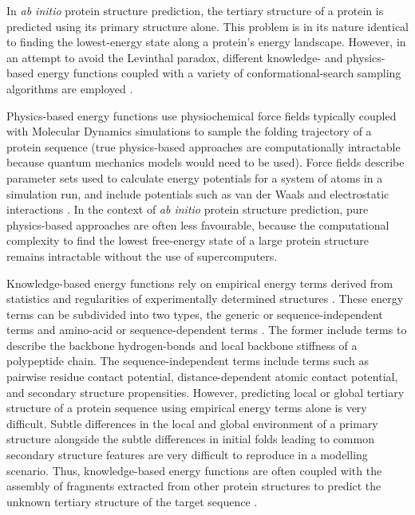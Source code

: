 In \textit{ab initio} protein structure prediction, the tertiary structure of a protein is predicted using its primary structure alone. This problem is in its nature identical to finding the lowest-energy state along a protein's energy landscape. However, in an attempt to avoid the Levinthal paradox, different knowledge- and physics-based energy functions coupled with a variety of conformational-search sampling algorithms are employed \cite{Lee2017-oc}. 

Physics-based energy functions use physiochemical force fields typically coupled with Molecular Dynamics simulations to sample the folding trajectory of a protein sequence (true physics-based approaches are computationally intractable because quantum mechanics models would need to be used). Force fields describe parameter sets used to calculate energy potentials for a system of atoms in a simulation run, and include potentials such as van der Waals and electrostatic interactions \cite{Lee2017-oc}. In the context of \textit{ab initio} protein structure prediction, pure physics-based approaches are often less favourable, because the computational complexity to find the lowest free-energy state of a large protein structure remains intractable without the use of supercomputers.

Knowledge-based energy functions rely on empirical energy terms derived from statistics and regularities of experimentally determined structures \cite{Lee2017-oc}. These energy terms can be subdivided into two types, the generic or sequence-independent terms and amino-acid or sequence-dependent terms \cite{Skolnick2006-uv}. The former include terms to describe the backbone hydrogen-bonds and local backbone stiffness of a polypeptide chain. The sequence-independent terms include terms such as pairwise residue contact potential, distance-dependent atomic contact potential, and secondary structure propensities. However, predicting local or global tertiary structure of a protein sequence using empirical energy terms alone is very difficult. Subtle differences in the local and global environment of a primary structure alongside the subtle differences in initial folds leading to common secondary structure features are very difficult to reproduce in a modelling scenario. Thus, knowledge-based energy functions are often coupled with the assembly of fragments extracted from other protein structures to predict the unknown tertiary structure of the target sequence \cite{Lee2017-oc}. 

